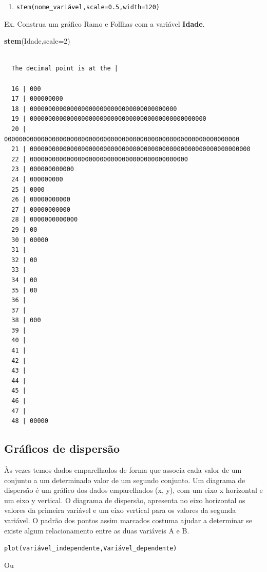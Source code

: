 \documentclass[12pt,portuguese,oneside]{book}
\newenvironment{Shaded}{\begin{snugshade}}{\end{snugshade}}
\newcommand{\KeywordTok}[1]{\textcolor[rgb]{0.13,0.29,0.53}{\textbf{#1}}}
\newcommand{\DataTypeTok}[1]{\textcolor[rgb]{0.13,0.29,0.53}{#1}}
\newcommand{\DecValTok}[1]{\textcolor[rgb]{0.00,0.00,0.81}{#1}}
\newcommand{\NormalTok}[1]{#1}
\providecommand{\tightlist}{%
  \setlength{\itemsep}{0pt}\setlength{\parskip}{0pt}}
\begin{document}
\begin{enumerate}
\def\labelenumi{\alph{enumi})}
\setcounter{enumi}{2}
\tightlist
\item
  \texttt{stem(nome\_variável,scale=0.5,width=120)}
\end{enumerate}

Ex. Construa um gráfico Ramo e Follhas com a variável \textbf{Idade}.

\begin{Shaded}
\begin{Highlighting}[]
\KeywordTok{stem}\NormalTok{(Idade,}\DataTypeTok{scale=}\DecValTok{2}\NormalTok{)}
\end{Highlighting}
\end{Shaded}

\begin{verbatim}

  The decimal point is at the |

  16 | 000
  17 | 000000000
  18 | 0000000000000000000000000000000000000000
  19 | 000000000000000000000000000000000000000000000000
  20 | 0000000000000000000000000000000000000000000000000000000000000000
  21 | 000000000000000000000000000000000000000000000000000000000000
  22 | 0000000000000000000000000000000000000000000
  23 | 000000000000
  24 | 000000000
  25 | 0000
  26 | 00000000000
  27 | 00000000000
  28 | 0000000000000
  29 | 00
  30 | 00000
  31 | 
  32 | 00
  33 | 
  34 | 00
  35 | 00
  36 | 
  37 | 
  38 | 000
  39 | 
  40 | 
  41 | 
  42 | 
  43 | 
  44 | 
  45 | 
  46 | 
  47 | 
  48 | 00000
\end{verbatim}

\subsection{Gráficos de dispersão}\label{graficos-de-dispersao}

Às vezes temos dados emparelhados de forma que associa cada valor de um
conjunto a um determinado valor de um segundo conjunto. Um diagrama de
dispersão é um gráfico dos dados emparelhados (x, y), com um eixo x
horizontal e um eixo y vertical. O diagrama de dispersão, apresenta no
eixo horizontal os valores da primeira variável e um eixo vertical para
os valores da segunda variável. O padrão dos pontos assim marcados
costuma ajudar a determinar se existe algum relacionamento entre as duas
variáveis A e B.

\texttt{plot(variável\_independente,Variável\_dependente)}

Ou
\end{document}
